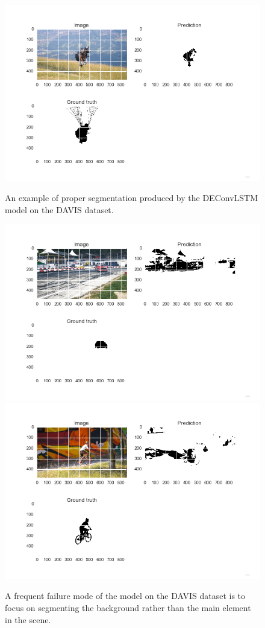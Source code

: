 \begin{figure}[t]
    \centering
    \includegraphics[trim={0 15mm 0 0},width=0.8\columnwidth]{img/deconvLSTM/paragliding-0.png}\\
    \caption{An example of proper segmentation produced by the DEConvLSTM model
        on the DAVIS dataset.}
    \label{fig:deconvlstm_gatech_sample}
\end{figure}

\begin{figure}[t]
    \centering
    \includegraphics[trim={0 15mm 0 0},width=0.8\columnwidth]{img/deconvLSTM/drift-0.png}\\
    \includegraphics[trim={0 15mm 0 0},width=0.8\columnwidth]{img/deconvLSTM/bmx-trees-0.png}
    \caption{A frequent failure mode of the model on the DAVIS dataset is to
        focus on segmenting the background rather than the main element in the
        scene.}
    \label{fig:deconvlstm_gatech_failure}
\end{figure}



